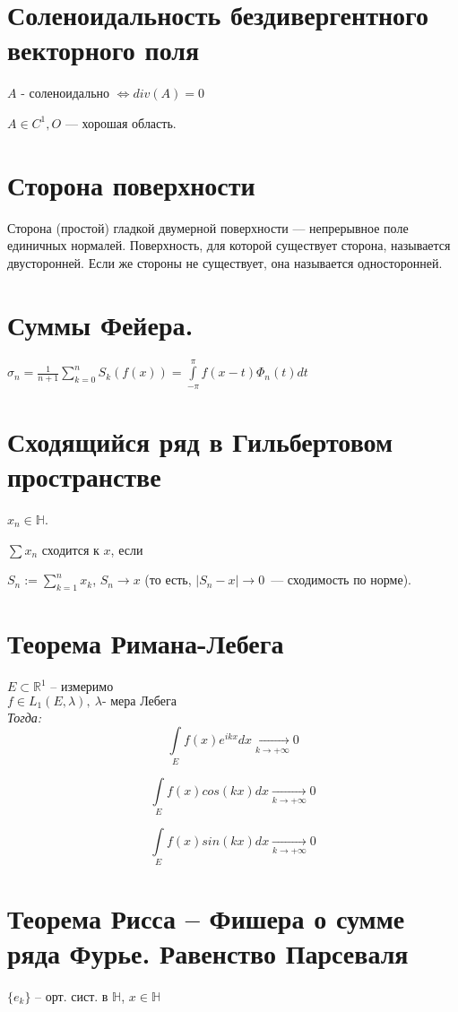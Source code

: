 \documentclass[paper=a4, fontsize=14pt]{article}
\begin{document}
\section{Соленоидальность бездивергентного векторного поля}

$A$ - соленоидально $ \Leftrightarrow div(A) = 0 $

$A \in C^1, O $ --- хорошая область.
\section{Сторона поверхности}

Сторона (простой) гладкой двумерной поверхности {{---}} непрерывное поле единичных нормалей. Поверхность, для которой существует сторона, называется двусторонней. Если же стороны не существует, она называется односторонней.


\section{Суммы Фейера.}
$ \sigma_n = \frac{1}{n + 1} \sum\limits_{k=0}^{n} S_k(f(x)) = \int\limits_{-\pi}^{\pi} f(x - t) \Phi_n(t) dt$

\section{Сходящийся ряд в Гильбертовом пространстве}
$x_n \in \mathds{H}$.

$\sum x_n$ сходится к $x$, если

$S_n := \sum\limits_{k = 1}^n x_k$, $S_n \rightarrow x$ (то есть, $|S_n - x| \rightarrow 0$~--- сходимость по норме).

\section{Теорема Римана-Лебега}
$E \subset \mathds{R}^1$ -- измеримо\\ $f \in L_1(E, \lambda), ~ \lambda \text{- мера Лебега}$ \\
\emph{Тогда:}
$$\int\limits_{E}f(x)e^{ikx}dx \xrightarrow[k \to +\infty]{} 0$$

$$\int\limits_{E}f(x)cos(kx)dx \xrightarrow[k \to +\infty]{} 0$$

$$\int\limits_{E}f(x)sin(kx)dx \xrightarrow[k \to +\infty]{} 0$$
\section{Теорема Рисса -- Фишера о сумме ряда Фурье. Равенство Парсеваля}
$\{e_k\}$ -- орт. сист. в $\mathds{H}$, $x \in \mathds{H}$\\
\end{document}
